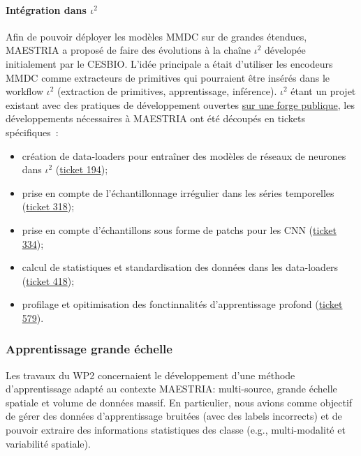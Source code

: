 \paragraph{Intégration dans $\iota^2$}
Afin de pouvoir déployer les modèles MMDC sur de grandes étendues, MAESTRIA a proposé de faire des évolutions à la chaîne $\iota^2$ dévelopée initialement par le CESBIO. L’idée principale a était d’utiliser les encodeurs MMDC comme extracteurs de primitives qui pourraient être insérés dans le workflow $\iota^2$ (extraction de primitives, apprentissage, inférence). $\iota^2$ étant un projet existant avec des pratiques de développement ouvertes \href{https://framagit.org/iota2-project/iota2}{sur une forge publique}, les développements nécessaires à MAESTRIA ont été découpés en tickets spécifiques :
\begin{itemize}
\item création de data-loaders pour entraîner des modèles de réseaux de neurones dans $\iota^2$ (\href{https://framagit.org/iota2-project/iota2/-/issues/194}{ticket 194});
\item prise en compte de l’échantillonnage irrégulier dans les séries temporelles (\href{https://framagit.org/iota2-project/iota2/-/issues/318}{ticket 318});
\item prise en compte d’échantillons sous forme de patchs pour les CNN (\href{https://framagit.org/iota2-project/iota2/-/issues/334}{ticket 334});
\item calcul de statistiques et standardisation des données dans les data-loaders (\href{https://framagit.org/iota2-project/iota2/-/issues/418}{ticket 418});
\item profilage et opitimisation des fonctinnalités d’apprentissage profond (\href{https://framagit.org/iota2-project/iota2/-/issues/579}{ticket 579}).
  
\end{itemize}


\subsubsection{Apprentissage grande échelle}
Les travaux du WP2 concernaient le développement d'une méthode d'apprentissage adapté au contexte MAESTRIA: multi-source, grande échelle spatiale et volume de données massif. En particulier, nous avions comme objectif de gérer des données d'apprentissage bruitées (avec des labels incorrects) et de pouvoir extraire des informations statistiques des classe (e.g., multi-modalité et variabilité spatiale).

